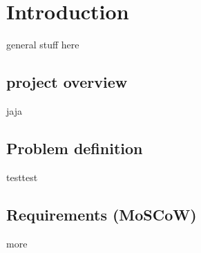 \chapter{Introduction}

general stuff here

\section{project overview}
jaja
\section{Problem definition}
testtest
\section{Requirements (MoSCoW)}
more


